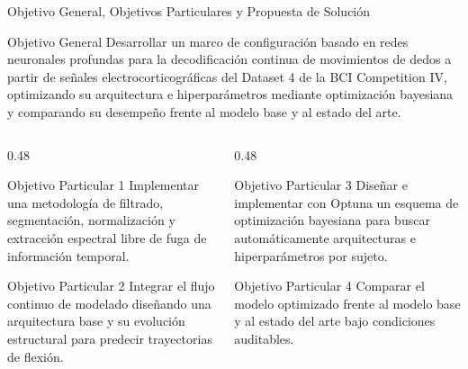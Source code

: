 \begin{frame}{Objetivo General, Objetivos Particulares y Propuesta de Soluci\'on}
  \begin{alertblock}{Objetivo General}
    \footnotesize
    Desarrollar un marco de configuraci\'on basado en redes neuronales profundas para la decodificaci\'on continua de movimientos de dedos a partir de se\~nales electrocorticogr\'aficas del Dataset 4 de la BCI Competition IV, optimizando su arquitectura e hiperpar\'ametros mediante optimizaci\'on bayesiana y comparando su desempe\~no frente al modelo base y al estado del arte.
  \end{alertblock}

  \vspace{2mm}
  \begin{columns}[T,onlytextwidth]
    \begin{column}{0.48\textwidth}
      \begin{block}{Objetivo Particular 1}
        \scriptsize
        Implementar una metodolog\'ia de filtrado, segmentaci\'on, normalizaci\'on y extracci\'on espectral libre de fuga de informaci\'on temporal.
      \end{block}
      \vspace{2mm}
      \begin{block}{Objetivo Particular 2}
        \scriptsize
        Integrar el flujo continuo de modelado dise\~nando una arquitectura base y su evoluci\'on estructural para predecir trayectorias de flexi\'on.
      \end{block}
    \end{column}

    \begin{column}{0.48\textwidth}
      \begin{block}{Objetivo Particular 3}
        \scriptsize
        Dise\~nar e implementar con Optuna un esquema de optimizaci\'on bayesiana para buscar autom\'aticamente arquitecturas e hiperpar\'ametros por sujeto.
      \end{block}
      \vspace{2mm}
      \begin{block}{Objetivo Particular 4}
        \scriptsize
        Comparar el modelo optimizado frente al modelo base y al estado del arte bajo condiciones auditables.
      \end{block}
    \end{column}
  \end{columns}
\end{frame}

